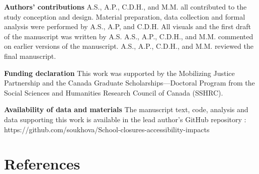 \documentclass[
default
]{sn-jnl}
\begin{document}
\textbf{Authors' contributions} A.S., A.P., C.D.H., and M.M. all
contributed to the study conception and design. Material preparation,
data collection and formal analysis were performed by A.S., A.P, and
C.D.H. All visuals and the first draft of the manuscript was written by
A.S. A.S., A.P., C.D.H., and M.M. commented on earlier versions of the
manuscript. A.S., A.P., C.D.H., and M.M. reviewed the final manuscript.

\textbf{Funding declaration} This work was supported by the Mobilizing
Justice Partnership and the Canada Graduate Scholarships---Doctoral
Program from the Social Sciences and Humanities Research Council of
Canada (SSHRC).

\textbf{Availability of data and materials} The manuscript text, code,
analysis and data supporting this work is available in the lead author's
GitHub repository :
https://github.com/soukhova/School-closures-accessibility-impacts

\pagebreak

\section{References}\label{references}
\end{document}
